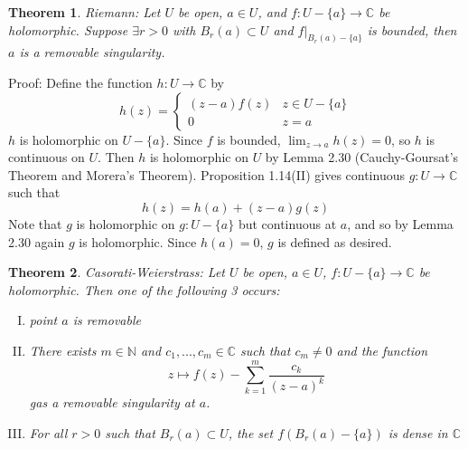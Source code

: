 \documentclass[11pt]{article}
\theoremstyle{plain}
\newtheorem{theorem}{Theorem}[section]
\theoremstyle{definition}
\newcommand{\C}{\mathbb{C}}
\begin{document}
\begin{theorem}
Riemann: Let $U$ be open, $a \in U$, and $f: U - \{ a \} \to \C$ be holomorphic. Suppose $\exists r > 0$ with $B_r(a) \subset U$ and $f|_{B_r(a) - \{a\}}$ is bounded, then $a$ is a removable singularity. 
\end{theorem}

Proof: Define the function $h: U \to \C$ by 
$$ h(z) = \begin{cases} (z - a)f(z) & z \in U - \{ a\} \\ 0 & z = a \end{cases} $$
$h$ is holomorphic on $U - \{ a \}$. Since $f$ is bounded, $\lim_{z \to a} h(z) = 0$, so $h$ is continuous on $U$. Then $h$ is holomorphic on $U$ by Lemma 2.30 (Cauchy-Goursat's Theorem and Morera's Theorem). Proposition 1.14(II) gives continuous $g: U \to \C$ such that 
$$ h(z) = h(a) + (z-a)g(z) $$
Note that $g$ is holomorphic on $g: U - \{ a \}$ but continuous at $a$, and so by Lemma 2.30 again $g$ is holomorphic. Since $h(a) = 0$, $g$ is defined as desired. 

\begin{theorem}
Casorati-Weierstrass: Let $U$ be open, $a \in U$, $f: U - \{ a \} \to \C$ be holomorphic. Then one of the following 3 occurs:
\begin{enumerate}[(I)]
\item point $a$ is removable
\item There exists $m \in \mathbb{N}$ and $c_1, ..., c_m \in \C$ such that $c_m \neq 0$ and the function 
$$ z \mapsto f(z) - \sum_{k=1}^{m}\frac{c_k}{(z-a)^k} $$
gas a removable singularity at $a$.
\item For all $r > 0$ such that $B_r(a) \subset U$, the set $f(B_r(a) - \{a\})$ is dense in $\C$ 
\end{enumerate}
\end{theorem}
\end{document}
